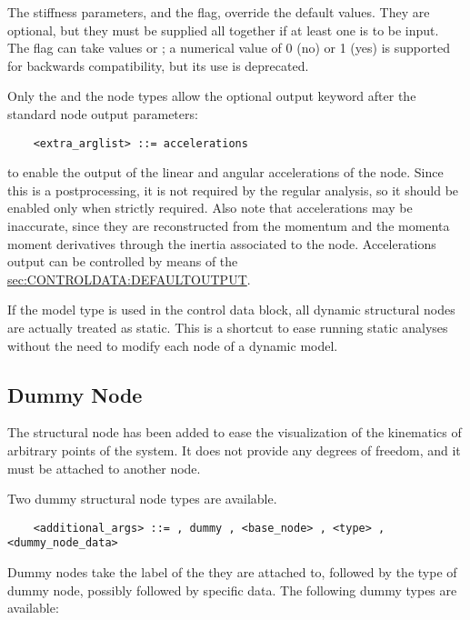 The stiffness parameters, and the  flag, 
override the default values. 
They are optional, but they must be supplied all together if at least
one is to be input. \\
The  flag can take values  or ;
a numerical value of 0 (no) or 1 (yes) is supported for backwards
compatibility, but its use is deprecated.

Only the  and the  node types allow
the optional output keyword
 after the standard node output parameters:
\begin{verbatim}
    <extra_arglist> ::= accelerations
\end{verbatim}
to enable the output of the linear and angular accelerations of the node.
Since this is a postprocessing, it is not required by the regular analysis,
so it should be enabled only when strictly required.
Also note that accelerations may be inaccurate, since they are reconstructed
from the momentum and the momenta moment derivatives through the inertia
associated to the node.
Accelerations output can be controlled by means of the
\hyperref{\kw{default output} statement}{\kw{default output} statement (see Section~}{)}{sec:CONTROLDATA:DEFAULTOUTPUT}.

If the  model type is used in the control data block,
all dynamic structural nodes are actually treated as static.
This is a shortcut to ease running static analyses without the need
to modify each node of a dynamic model.

\subsection{Dummy Node}
\label{sec:NODE:STRUCTURAL:DUMMY}
The  structural node has been added to ease the visualization
of the kinematics of arbitrary points of the system. 
It does not provide any degrees of freedom, and it must be attached
to another node.

Two dummy structural node types are available.
\begin{verbatim}
    <additional_args> ::= , dummy , <base_node> , <type> , <dummy_node_data>
\end{verbatim}

Dummy nodes take the label of the  they are attached to, 
followed by the type of dummy node, possibly followed by specific data.
The following dummy types are available:

